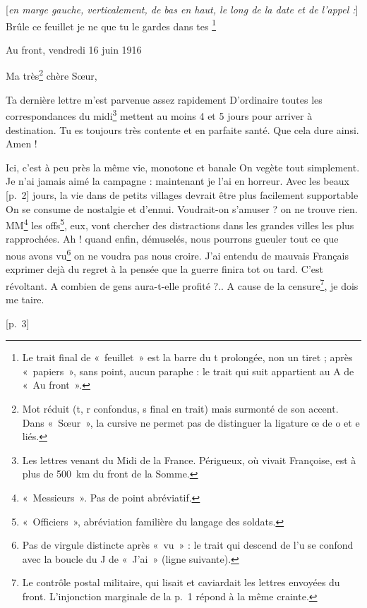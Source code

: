 \begin{LJlettre}
[p.~1]\par\nopagebreak[4]

[\textit{en marge gauche, verticalement, de bas en haut, le long de la date et de l'appel :}] Brûle ce feuillet je ne  que tu le gardes dans tes \footnote{Le trait final de «~feuillet~» est la barre du t prolongée, non un tiret ; après «~papiers~», sans point, aucun paraphe : le trait qui suit appartient au A de «~Au front~».}

\hfill Au front, vendredi 16 juin 1916

Ma très\footnote{Mot réduit (t, r confondus, s final en trait) mais surmonté de son accent. Dans «~Sœur~», la cursive ne permet pas de distinguer la ligature œ de o et e liés.} chère Sœur,

Ta dernière lettre m'est parvenue assez rapidement D'ordinaire toutes les correspondances du midi\footnote{Les lettres venant du Midi de la France. Périgueux, où vivait Françoise, est à plus de 500~km du front de la Somme.} mettent au moins 4 et 5 jours pour arriver à destination. Tu es toujours très contente et en parfaite santé. Que cela dure ainsi. Amen !

Ici, c'est à peu près la même vie, monotone et banale On vegète tout simplement. Je n'ai jamais aimé la campagne : maintenant je l'ai en horreur. Avec les beaux [p.~2] jours, la vie dans de petits villages devrait être plus facilement supportable On se consume de nostalgie et d'ennui. Voudrait-on s'amuser ? on ne trouve rien. MM\footnote{«~Messieurs~». Pas de point abréviatif.} les offs\footnote{«~Officiers~», abréviation familière du langage des soldats.}, eux, vont chercher des distractions dans les grandes villes les plus rapprochées. Ah ! quand enfin, démuselés, nous pourrons gueuler tout ce que nous avons vu\footnote{Pas de virgule distincte après «~vu~» : le trait qui descend de l'u se confond avec la boucle du J de «~J'ai~» (ligne suivante).} on ne voudra pas nous croire. J'ai entendu de mauvais Français exprimer dejà du regret à la pensée que la guerre finira tot ou tard. C'est révoltant. A combien de gens aura-t-elle profité ?.. A cause de la censure\footnote{Le contrôle postal militaire, qui lisait et caviardait les lettres envoyées du front. L'injonction marginale de la p.~1 répond à la même crainte.}, je dois me taire.

[p.~3]\par\nopagebreak[4]


\end{LJlettre}
